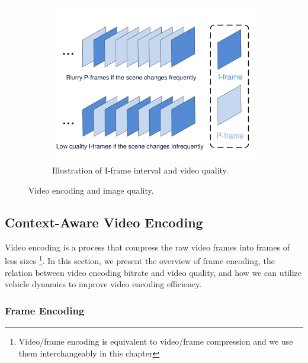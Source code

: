 \begin{figure}[ht]
\begin{subfigure}[t]{0.3\textwidth}
    \includegraphics[width=\linewidth]{Figs/RTDrive/intervals.pdf}
    \caption{Illustration of I-frame interval and video quality.}
    \label{interval}
  \end{subfigure}
\caption{Video encoding and image quality.}
\end{figure}


\subsection{Context-Aware Video Encoding}


Video encoding is a process that compress the raw video frames 
into frames of less sizes 
\footnote{Video/frame encoding is equivalent to video/frame compression 
and we use them interchangeably in this chapter}.
In this section, we present the overview of frame encoding, 
the relation between video encoding bitrate and video
quality, and how we can utilize
vehicle dynamics to improve video encoding efficiency.  

\subsubsection{Frame Encoding}
\label{sec_frame_encoding}




